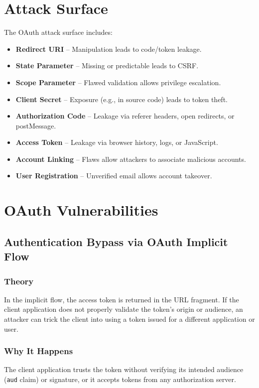 \documentclass[12pt,a4paper]{article}
\begin{document}
\section{Attack Surface}
The OAuth attack surface includes:
\begin{itemize}
    \item \textbf{Redirect URI} – Manipulation leads to code/token leakage.
    \item \textbf{State Parameter} – Missing or predictable leads to CSRF.
    \item \textbf{Scope Parameter} – Flawed validation allows privilege escalation.
    \item \textbf{Client Secret} – Exposure (e.g., in source code) leads to token theft.
    \item \textbf{Authorization Code} – Leakage via referer headers, open redirects, or postMessage.
    \item \textbf{Access Token} – Leakage via browser history, logs, or JavaScript.
    \item \textbf{Account Linking} – Flaws allow attackers to associate malicious accounts.
    \item \textbf{User Registration} – Unverified email allows account takeover.
\end{itemize}

\section{OAuth Vulnerabilities}
\subsection{Authentication Bypass via OAuth Implicit Flow}
\subsubsection{Theory}
In the implicit flow, the access token is returned in the URL fragment. If the client application does not properly validate the token's origin or audience, an attacker can trick the client into using a token issued for a different application or user.

\subsubsection{Why It Happens}
The client application trusts the token without verifying its intended audience (\texttt{aud} claim) or signature, or it accepts tokens from any authorization server.
\end{document}
